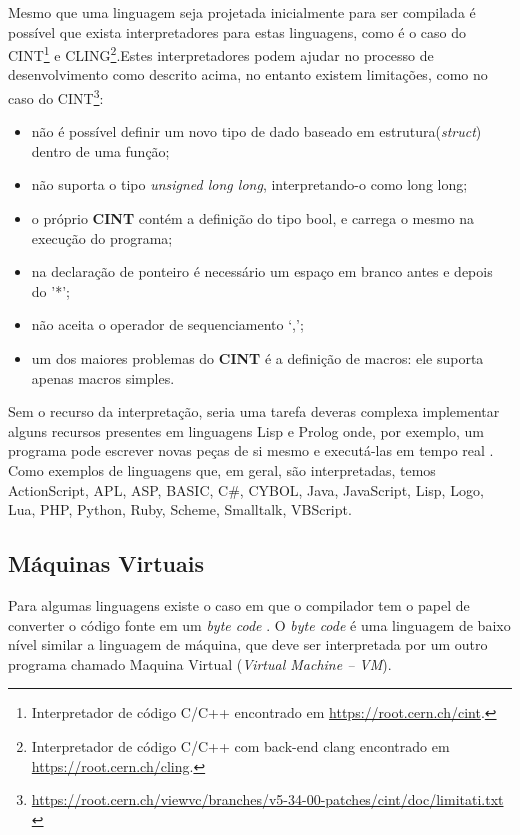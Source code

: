 Mesmo que uma linguagem seja projetada inicialmente para ser compilada é possível que exista 
interpretadores para estas linguagens, como é o caso do CINT\footnote{
Interpretador de código C/C++ encontrado em \url{https://root.cern.ch/cint}.}
 e CLING\footnote{Interpretador de código C/C++ com back-end clang encontrado em
  \url{https://root.cern.ch/cling}.}.Estes interpretadores podem ajudar no 
  processo de desenvolvimento como descrito acima, no entanto existem 
  limitações, como no caso do CINT\footnote{
  \url{https://root.cern.ch/viewvc/branches/v5-34-00-patches/cint/doc/limitati.txt }}:

\begin{itemize}
	\item não é possível definir um novo tipo de dado baseado em estrutura(\textit{struct}) dentro de uma função;
    \item não suporta o tipo \textit{unsigned long long}, interpretando-o como long long;
    \item o próprio \textbf{CINT} contém a definição do tipo bool, e carrega o mesmo na execução do programa;
    \item na declaração de ponteiro é necessário um espaço em branco antes e depois do '*'; 
    \item não aceita o operador de sequenciamento ‘,’; 
    \item um dos maiores problemas do \textbf{CINT} é a definição de macros:
 ele suporta apenas macros simples.
\end{itemize}

Sem  o recurso da interpretação, seria uma tarefa deveras complexa implementar 
alguns recursos  presentes em linguagens Lisp e Prolog onde, por exemplo, 
um programa pode escrever novas peças de si mesmo e executá-las em tempo real
 \cite[pág. 17]{ref6}.
Como exemplos de linguagens que, em geral, são interpretadas, temos ActionScript,
 APL, ASP, BASIC, C\#, CYBOL, Java, JavaScript, Lisp, Logo, Lua, PHP, Python, Ruby,
 Scheme, Smalltalk, VBScript.
 

\subsection{Máquinas Virtuais}

Para algumas linguagens existe o caso em que o compilador tem o papel
 de converter o código fonte em um \textit{byte code} \cite[pág. 49]{ref9}. 
O \textit{byte code}
é uma linguagem de baixo nível  similar a linguagem de máquina, que 
deve ser interpretada por um outro programa chamado Maquina Virtual (\textit{Virtual Machine -- VM}).

